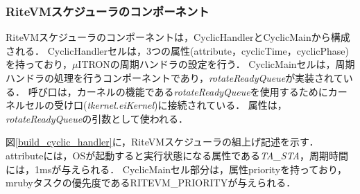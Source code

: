 \documentclass[submit,techrep]{ipsj}
\begin{document}
\subsubsection{RiteVMスケジューラのコンポーネント}
RiteVMスケジューラのコンポーネントは，CyclicHandlerとCyclicMainから構成される．
CyclicHandlerセルは，3つの属性(attribute，cyclicTime，cyclicPhase)を持っており，$\mu$ITRONの周期ハンドラ\cite{par:microITRON}の設定を行う．
CyclicMainセルは，周期ハンドラの処理を行うコンポーネントであり，{\it rotateReadyQueue}が実装されている．
呼び口は，カーネルの機能である{\it rotateReadyQueue}を使用するためにカーネルセルの受け口({\it tkernel.eiKernel})に接続されている．
属性は，{\it rotateReadyQueue}の引数として使われる．

図\ref{build_cyclic_handler}に，RiteVMスケジューラの組上げ記述を示す．
attributeには，OSが起動すると実行状態になる属性である{\it TA\_STA}，周期時間には，1msが与えられる．
CyclicMainセル部分は，属性priorityを持っており，mrubyタスクの優先度であるRITEVM\_PRIORITYが与えられる．
\end{document}
